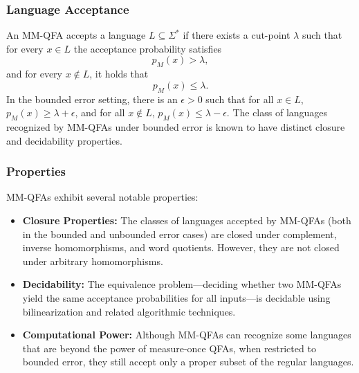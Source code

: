 \subsubsection{Language Acceptance}
An MM-QFA accepts a language $L\subseteq\Sigma^*$ if there exists a cut-point $\lambda$ such that for every $x\in L$ the acceptance probability satisfies
\[
p_M(x) > \lambda,
\]
and for every $x\notin L$, it holds that
\[
p_M(x) \le \lambda.
\]
In the bounded error setting, there is an $\epsilon > 0$ such that for all $x\in L$, $p_M(x)\ge \lambda + \epsilon$, and for all $x\notin L$, $p_M(x)\le \lambda - \epsilon$. The class of languages recognized by MM-QFAs under bounded error is known to have distinct closure and decidability properties.

\subsubsection{Properties}
MM-QFAs exhibit several notable properties:
\begin{itemize}
  \item \textbf{Closure Properties:} The classes of languages accepted by MM-QFAs (both in the bounded and unbounded error cases) are closed under complement, inverse homomorphisms, and word quotients. However, they are not closed under arbitrary homomorphisms.
  \item \textbf{Decidability:} The equivalence problem—deciding whether two MM-QFAs yield the same acceptance probabilities for all inputs—is decidable using bilinearization and related algorithmic techniques.
  \item \textbf{Computational Power:} Although MM-QFAs can recognize some languages that are beyond the power of measure-once QFAs, when restricted to bounded error, they still accept only a proper subset of the regular languages.
\end{itemize}


